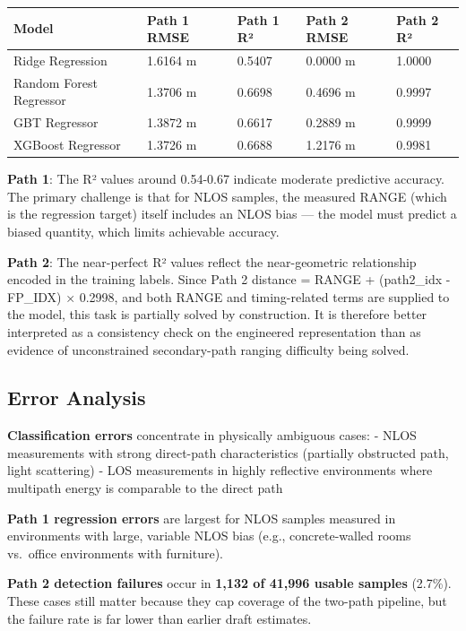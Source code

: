 \documentclass[12pt,a4paper]{article}
\newcounter{none}
\begin{document}
{\def\LTcaptype{none} %
\begin{longtable}[]{@{}lllll@{}}
\toprule\noalign{}
Model & Path 1 RMSE & Path 1 R² & Path 2 RMSE & Path 2 R² \\
\midrule\noalign{}
\endhead
\bottomrule\noalign{}
\endlastfoot
Ridge Regression & 1.6164 m & 0.5407 & 0.0000 m & 1.0000 \\
Random Forest Regressor & 1.3706 m & 0.6698 & 0.4696 m & 0.9997 \\
GBT Regressor & 1.3872 m & 0.6617 & 0.2889 m & 0.9999 \\
XGBoost Regressor & 1.3726 m & 0.6688 & 1.2176 m & 0.9981 \\
\end{longtable}
}

\textbf{Path 1}: The R² values around 0.54-0.67 indicate moderate
predictive accuracy. The primary challenge is that for NLOS samples, the
measured RANGE (which is the regression target) itself includes an NLOS
bias --- the model must predict a biased quantity, which limits
achievable accuracy.

\textbf{Path 2}: The near-perfect R² values reflect the near-geometric
relationship encoded in the training labels. Since Path 2 distance =
RANGE + (path2\_idx - FP\_IDX) × 0.2998, and both RANGE and
timing-related terms are supplied to the model, this task is partially
solved by construction. It is therefore better interpreted as a
consistency check on the engineered representation than as evidence of
unconstrained secondary-path ranging difficulty being solved.

\subsection{Error Analysis}\label{error-analysis}

\textbf{Classification errors} concentrate in physically ambiguous
cases: - NLOS measurements with strong direct-path characteristics
(partially obstructed path, light scattering) - LOS measurements in
highly reflective environments where multipath energy is comparable to
the direct path

\textbf{Path 1 regression errors} are largest for NLOS samples measured
in environments with large, variable NLOS bias (e.g., concrete-walled
rooms vs.~office environments with furniture).

\textbf{Path 2 detection failures} occur in \textbf{1,132 of 41,996
usable samples} (2.7\%). These cases still matter because they cap
coverage of the two-path pipeline, but the failure rate is far lower
than earlier draft estimates.
\end{document}
